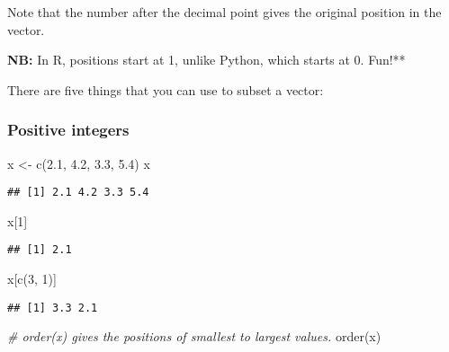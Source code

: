 \documentclass[
]{book}
\newenvironment{Shaded}{\begin{snugshade}}{\end{snugshade}}
\newcommand{\CommentTok}[1]{\textcolor[rgb]{0.56,0.35,0.01}{\textit{#1}}}
\newcommand{\DecValTok}[1]{\textcolor[rgb]{0.00,0.00,0.81}{#1}}
\newcommand{\FloatTok}[1]{\textcolor[rgb]{0.00,0.00,0.81}{#1}}
\newcommand{\FunctionTok}[1]{\textcolor[rgb]{0.00,0.00,0.00}{#1}}
\newcommand{\NormalTok}[1]{#1}
\newcommand{\OtherTok}[1]{\textcolor[rgb]{0.56,0.35,0.01}{#1}}
\begin{document}
Note that the number after the decimal point gives the original position in the vector.

\textbf{NB:} In R, positions start at 1, unlike Python, which starts at 0. Fun!**

There are five things that you can use to subset a vector:

\hypertarget{positive-integers}{%
\subsubsection{Positive integers}\label{positive-integers}}

\begin{Shaded}
\begin{Highlighting}[]
\NormalTok{x }\OtherTok{\textless{}{-}} \FunctionTok{c}\NormalTok{(}\FloatTok{2.1}\NormalTok{, }\FloatTok{4.2}\NormalTok{, }\FloatTok{3.3}\NormalTok{, }\FloatTok{5.4}\NormalTok{)}
\NormalTok{x}
\end{Highlighting}
\end{Shaded}

\begin{verbatim}
## [1] 2.1 4.2 3.3 5.4
\end{verbatim}

\begin{Shaded}
\begin{Highlighting}[]
\NormalTok{x[}\DecValTok{1}\NormalTok{]}
\end{Highlighting}
\end{Shaded}

\begin{verbatim}
## [1] 2.1
\end{verbatim}

\begin{Shaded}
\begin{Highlighting}[]
\NormalTok{x[}\FunctionTok{c}\NormalTok{(}\DecValTok{3}\NormalTok{, }\DecValTok{1}\NormalTok{)]}
\end{Highlighting}
\end{Shaded}

\begin{verbatim}
## [1] 3.3 2.1
\end{verbatim}

\begin{Shaded}
\begin{Highlighting}[]
\CommentTok{\# \textasciigrave{}order(x)\textasciigrave{} gives the positions of smallest to largest values.}
\FunctionTok{order}\NormalTok{(x)}
\end{Highlighting}
\end{Shaded}
\end{document}

